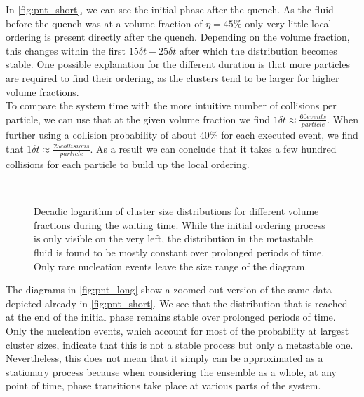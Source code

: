 In \autoref{fig:pnt_short}, we can see the initial phase after the quench. As the fluid before the quench was at a volume fraction of $\eta=45\%$ only very little local ordering is present directly after the quench. Depending on the volume fraction, this changes within the first $15 \delta t - 25 \delta t$ after which the distribution becomes stable. One possible explanation for the different duration is that more particles are required to find their ordering, as the clusters tend to be larger for higher volume fractions.\\

To compare the system time with the more intuitive number of collisions per particle, we can use that at the given volume fraction we find  $1\delta t \approx \frac{60 events}{particle}$. When further using a collision probability of about $40 \%$ for each executed event, we find that $1\delta t \approx \frac{25 collisions}{particle}$. As a result we can conclude that it takes a few hundred collisions for each particle to build up the local ordering.\\

\begin{figure}[h]
\begin{center}
 \hspace{0.0cm}
\\
 \hspace{0.0cm}
\caption[Cluster size distributions for long waiting times]{Decadic logarithm of cluster size distributions for different volume fractions during the waiting time. While the initial ordering process is only visible on the very left, the distribution in the metastable fluid is found to be mostly constant over prolonged periods of time. Only rare nucleation events leave the size range of the diagram.}
\label{fig:pnt_long}
\end{center}
\end{figure}

The diagrams in \autoref{fig:pnt_long} show a zoomed out version of the same data depicted already in \autoref{fig:pnt_short}. We see that the distribution that is reached at the end of the initial phase remains stable over prolonged periods of time. Only the nucleation events, which account for most of the probability at largest cluster sizes, indicate that this is not a stable process but only a metastable one. Nevertheless, this does not mean that it simply can be approximated as a stationary process because when considering the ensemble as a whole, at any point of time, phase transitions take place at various parts of the system.


